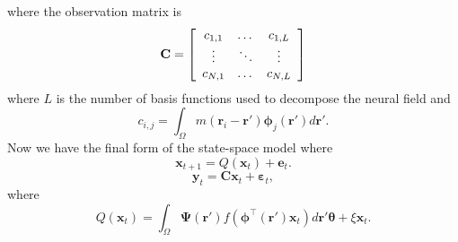 \documentclass[10pt,a4paper]{article}
\begin{document}
where the observation matrix is 
\begin{equation}
	\mathbf{C} = \left[
	\begin{array}{{ccc}} 
		c_{1,1} & \dots & c_{1,L} \\
		\vdots & \ddots & \vdots \\
		c_{N,1} & \dots & c_{N,L} 
	\end{array}
	\right] 
\end{equation}
where $L$ is the number of basis functions used to decompose the neural field and 
\begin{equation}
	c_{i,j} = \int_{\Omega}m(\mathbf{r}_i - \mathbf{r}')\boldsymbol{\phi}_j(\mathbf{r}')d\mathbf{r}'. 
\end{equation}
Now we have the final form of the state-space model where
\begin{equation}\label{eq:finalformstatespacemodel}
	\mathbf{x}_{t+1} = Q(\mathbf{x}_t) +\mathbf{e}_t.
\end{equation}
\begin{equation} 
	\mathbf{y}_t = \mathbf{C}\mathbf{x}_t + \boldsymbol{\varepsilon}_t,
\end{equation}
where 
\begin{equation}\label{eq:QmatrixForSigmapoints}
	Q(\mathbf{x}_t) = \int_\Omega \boldsymbol{\Psi}(\mathbf{r}') f(\boldsymbol{\phi}^{\top}(\mathbf{r}')\mathbf{x}_t) d\mathbf{r}' \boldsymbol{\theta} + \xi\mathbf{x}_t.
\end{equation}

\end{document}
